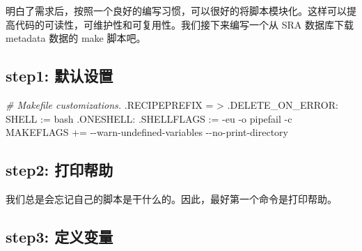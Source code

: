\documentclass[]{ctexbook}
\newenvironment{Shaded}{\begin{snugshade}}{\end{snugshade}}
\newcommand{\CharTok}[1]{\textcolor[rgb]{0.31,0.60,0.02}{#1}}
\newcommand{\CommentTok}[1]{\textcolor[rgb]{0.56,0.35,0.01}{\textit{#1}}}
\newcommand{\DataTypeTok}[1]{\textcolor[rgb]{0.13,0.29,0.53}{#1}}
\newcommand{\DecValTok}[1]{\textcolor[rgb]{0.00,0.00,0.81}{#1}}
\newcommand{\NormalTok}[1]{#1}
\newcommand{\OtherTok}[1]{\textcolor[rgb]{0.56,0.35,0.01}{#1}}
\newcommand{\StringTok}[1]{\textcolor[rgb]{0.31,0.60,0.02}{#1}}
\begin{document}
明白了需求后，按照一个良好的编写习惯，可以很好的将脚本模块化。这样可以提高代码的可读性，可维护性和可复用性。我们接下来编写一个从 SRA 数据库下载 metadata 数据的 make 脚本吧。

\subsection{step1: 默认设置}\label{step1-ux9ed8ux8ba4ux8bbeux7f6e}

\begin{Shaded}
\begin{Highlighting}[]
\CommentTok{\# Makefile customizations.}
\DataTypeTok{.RECIPEPREFIX} \CharTok{=}\StringTok{ \textgreater{}}
\OtherTok{.DELETE\_ON\_ERROR:}
\DataTypeTok{SHELL} \CharTok{:=}\StringTok{ bash}
\OtherTok{.ONESHELL:}
\DataTypeTok{.SHELLFLAGS} \CharTok{:=}\StringTok{ {-}eu {-}o pipefail {-}c}
\DataTypeTok{MAKEFLAGS} \CharTok{+=}\StringTok{ {-}{-}warn{-}undefined{-}variables {-}{-}no{-}print{-}directory}
\end{Highlighting}
\end{Shaded}

\subsection{step2: 打印帮助}\label{step2-ux6253ux5370ux5e2eux52a9}

我们总是会忘记自己的脚本是干什么的。因此，最好第一个命令是打印帮助。

\begin{Shaded}
\end{Shaded}

\subsection{step3: 定义变量}\label{step3-ux5b9aux4e49ux53d8ux91cf}
\end{document}
